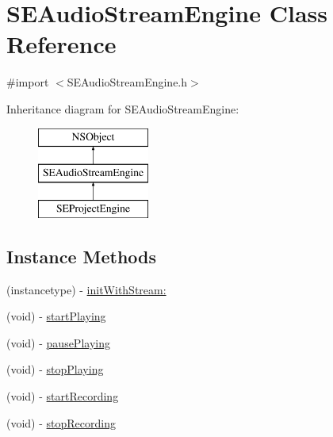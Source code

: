 \hypertarget{interface_s_e_audio_stream_engine}{\section{S\-E\-Audio\-Stream\-Engine Class Reference}
\label{interface_s_e_audio_stream_engine}
}


{\ttfamily \#import $<$S\-E\-Audio\-Stream\-Engine.\-h$>$}

Inheritance diagram for S\-E\-Audio\-Stream\-Engine\-:\begin{figure}[H]
\begin{center}
\leavevmode
\includegraphics[height=3.000000cm]{interface_s_e_audio_stream_engine}
\end{center}
\end{figure}
\subsection*{Instance Methods}
\begin{DoxyCompactItemize}
\item 
(instancetype) -\/ \hyperlink{interface_s_e_audio_stream_engine_a1ec76b50caa6e569a74fb1fc642d6ede}{init\-With\-Stream\-:}
\item 
(void) -\/ \hyperlink{interface_s_e_audio_stream_engine_a6e3666a25828115786cc39ad40741a9d}{start\-Playing}
\item 
(void) -\/ \hyperlink{interface_s_e_audio_stream_engine_ae75c4a24cb45b92433a0f954c7180489}{pause\-Playing}
\item 
(void) -\/ \hyperlink{interface_s_e_audio_stream_engine_a77d1d55cf373ab32b01d20b7997b13f2}{stop\-Playing}
\item 
(void) -\/ \hyperlink{interface_s_e_audio_stream_engine_ad19a0488b4ea40ae9ae54c38526895de}{start\-Recording}
\item 
(void) -\/ \hyperlink{interface_s_e_audio_stream_engine_a2a1cd707ceb8fb2801826c38d932da66}{stop\-Recording}
\end{DoxyCompactItemize}
